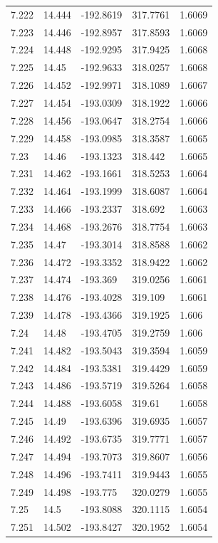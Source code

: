 \begin{tabular}{lllll}
7.222 & 14.444 & -192.8619 & 317.7761 & 1.6069 \\
7.223 & 14.446 & -192.8957 & 317.8593 & 1.6069 \\
7.224 & 14.448 & -192.9295 & 317.9425 & 1.6068 \\
7.225 & 14.45 & -192.9633 & 318.0257 & 1.6068 \\
7.226 & 14.452 & -192.9971 & 318.1089 & 1.6067 \\
7.227 & 14.454 & -193.0309 & 318.1922 & 1.6066 \\
7.228 & 14.456 & -193.0647 & 318.2754 & 1.6066 \\
7.229 & 14.458 & -193.0985 & 318.3587 & 1.6065 \\
7.23 & 14.46 & -193.1323 & 318.442 & 1.6065 \\
7.231 & 14.462 & -193.1661 & 318.5253 & 1.6064 \\
7.232 & 14.464 & -193.1999 & 318.6087 & 1.6064 \\
7.233 & 14.466 & -193.2337 & 318.692 & 1.6063 \\
7.234 & 14.468 & -193.2676 & 318.7754 & 1.6063 \\
7.235 & 14.47 & -193.3014 & 318.8588 & 1.6062 \\
7.236 & 14.472 & -193.3352 & 318.9422 & 1.6062 \\
7.237 & 14.474 & -193.369 & 319.0256 & 1.6061 \\
7.238 & 14.476 & -193.4028 & 319.109 & 1.6061 \\
7.239 & 14.478 & -193.4366 & 319.1925 & 1.606 \\
7.24 & 14.48 & -193.4705 & 319.2759 & 1.606 \\
7.241 & 14.482 & -193.5043 & 319.3594 & 1.6059 \\
7.242 & 14.484 & -193.5381 & 319.4429 & 1.6059 \\
7.243 & 14.486 & -193.5719 & 319.5264 & 1.6058 \\
7.244 & 14.488 & -193.6058 & 319.61 & 1.6058 \\
7.245 & 14.49 & -193.6396 & 319.6935 & 1.6057 \\
7.246 & 14.492 & -193.6735 & 319.7771 & 1.6057 \\
7.247 & 14.494 & -193.7073 & 319.8607 & 1.6056 \\
7.248 & 14.496 & -193.7411 & 319.9443 & 1.6055 \\
7.249 & 14.498 & -193.775 & 320.0279 & 1.6055 \\
7.25 & 14.5 & -193.8088 & 320.1115 & 1.6054 \\
7.251 & 14.502 & -193.8427 & 320.1952 & 1.6054 \\

\end{tabular}
